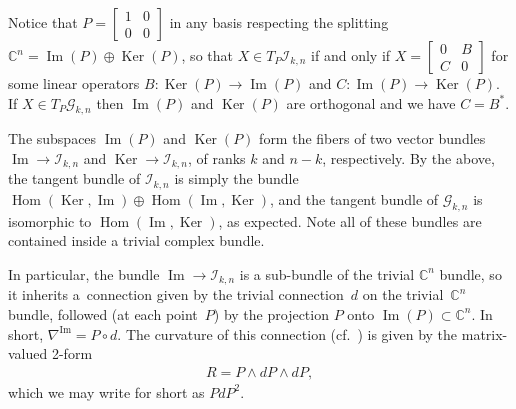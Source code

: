\documentclass[11pt]{article}
\numberwithin{equation}{section}
\newcommand{\CC}{\mathbb{C}}
\newcommand{\cG}{{\mathcal G}}
\newcommand{\cI}{{\mathcal I}}
\begin{document}
Notice that $P =\left[\begin{smallmatrix}
1 & 0 \\
0 & 0
\end{smallmatrix}\right]$ in any basis respecting the splitting $\CC^n = \operatorname{Im}(P) \oplus \operatorname{Ker}(P)$, so that $X \in T_P \cI_{k,n}$ if and only if
$X =\left[\begin{smallmatrix}
0 & B \\
C & 0
\end{smallmatrix}\right]$ for some linear operators $B\colon \operatorname{Ker}(P) \to \operatorname{Im}(P)$ and $C \colon \operatorname{Im}(P) \to \operatorname{Ker}(P)$. If $X \in T_P \cG_{k,n}$ then $\operatorname{Im}(P)$ and $\operatorname{Ker}(P)$ are orthogonal and we have $C = B^*$.

The subspaces $\operatorname{Im}(P)$ and $\operatorname{Ker}(P)$ form the fibers of two vector bundles $\operatorname{Im} \to \cI_{k,n}$ and
$\operatorname{Ker} \to \cI_{k,n}$, of ranks $k$ and $n-k$, respectively. By the above, the tangent bundle of $\cI_{k,n}$ is simply the bundle $\operatorname{Hom}( \operatorname{Ker}, \operatorname{Im}) \oplus \operatorname{Hom}( \operatorname{Im}, \operatorname{Ker})$, and the tangent bundle of $\cG_{k,n}$ is isomorphic to $\operatorname{Hom}(\operatorname{Im},\operatorname{Ker})$, as expected. Note all of these bundles are contained inside a trivial complex bundle.

In particular, the bundle $\operatorname{Im} \to \cI_{k,n}$ is a sub-bundle of the trivial $\CC^n$ bundle, so it inherits a~connection given by
the trivial connection~$d$ on the trivial~$\CC^n$ bundle, followed (at each point~$P$) by the projection $P$ onto $\operatorname{Im}(P) \subset \CC^n$. In short, $\nabla^{\operatorname{Im}} = P \circ d$. The curvature of this connection (cf.~\cite[p.~344]{K}) is given by the matrix-valued 2-form
\begin{gather*}
R = P \wedge dP \wedge dP,
\end{gather*}
which we may write for short as $PdP^2$.
\end{document}
